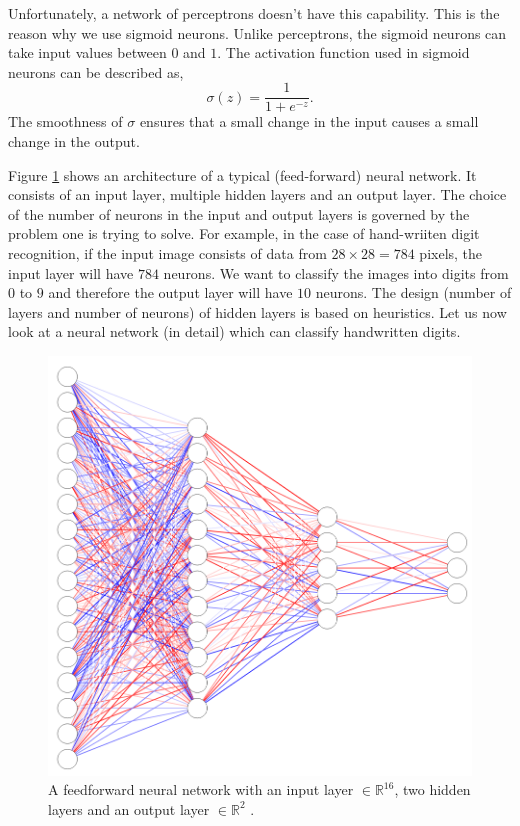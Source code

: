 Unfortunately, a network of perceptrons doesn't have this capability. This is the reason why we use sigmoid neurons. Unlike perceptrons, the sigmoid 
neurons can take input values between $0$ and $1$. The activation function used in sigmoid neurons can be described as, 
$$\sigma(z) = \frac{1}{1 + e^{-z}}.$$
The smoothness of $\sigma$ ensures that a small change in the input causes a small change in the output. 

Figure \ref{fig:deepNN} shows an architecture of a typical (feed-forward) neural network. It consists of an input layer, multiple hidden layers and an output layer. The choice of
the number of neurons in the input and output layers is governed by the problem one is trying to solve. For example, in the case of 
hand-wriiten digit recognition, if the input image consists of data from $28 \times 28 = 784$ pixels, the input layer will have $784$ neurons. We want to classify the 
images into digits from $0$ to $9$ and therefore the output layer will have $10$ neurons. The design (number of layers and number of neurons) of hidden layers
is based on heuristics. Let us now look at a neural network (in detail) which can classify handwritten digits. 
\begin{figure}[htbp]
    \centering
    \includegraphics[width=.4\textwidth]{Figures/DeepNN.png}
    \caption{A feedforward neural network with an input layer $\in \mathbb{R}^{16}$, two hidden layers and an output layer $\in \mathbb{R}^2$ \cite{nn_SVG}.}
    \label{fig:deepNN}
\end{figure}
